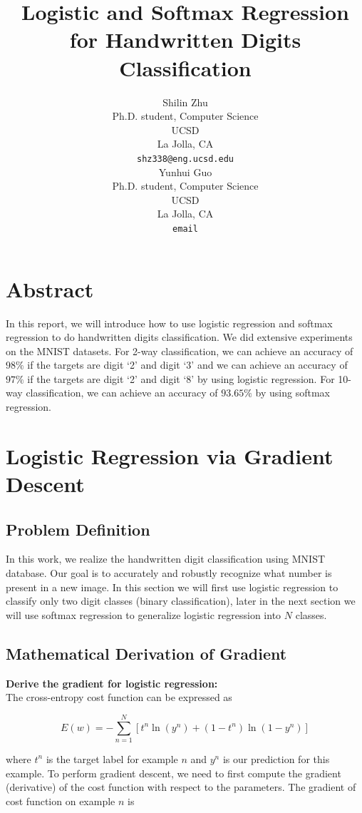 \documentclass{article} %
\title{Logistic and Softmax Regression for Handwritten Digits Classification}
\author{
Shilin Zhu \\
Ph.D. student, Computer Science\\
UCSD\\
La Jolla, CA \\
\texttt{shz338@eng.ucsd.edu} \\
\And
Yunhui Guo\\
Ph.D. student, Computer Science\\
UCSD\\
La Jolla, CA \\
\texttt{email} \\
}
\begin{document}
\maketitle

\section{Abstract}
In this report, we will introduce how to use logistic regression and softmax regression to do handwritten digits classification. We did extensive experiments on the MNIST datasets. For 2-way classification, we can achieve an accuracy of $98\%$ if the targets are digit `2' and digit `3' and we can achieve an accuracy of $97\%$ if the targets are digit `2' and digit `8' by using logistic regression. For 10-way classification, we can achieve an accuracy  of $93.65\%$ by using softmax regression.

\section{Logistic Regression via Gradient Descent}

\subsection{Problem Definition}
In this work, we realize the handwritten digit classification using MNIST database. Our goal is to accurately and robustly recognize what number is present in a new image. In this section we will first use logistic regression to classify only two digit classes (binary classification), later in the next section we will use softmax regression to generalize logistic regression into $N$ classes.

\subsection{Mathematical Derivation of Gradient}
\textbf{Derive the gradient for logistic regression:} \\
The cross-entropy cost function can be expressed as

\begin{equation}
	E(w) = - \sum_{n=1}^{N}[t^{n}\ln(y^{n})+(1-t^{n})\ln(1-y^{n})]
\end{equation}

where $t^{n}$ is the target label for example $n$ and $y^{n}$ is our prediction for this example. To perform gradient descent, we need to first compute the gradient (derivative) of the cost function with respect to the parameters. The gradient of cost function on example $n$ is
\end{document}
